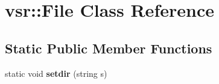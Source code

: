 \hypertarget{classvsr_1_1_file}{\section{vsr\-:\-:File Class Reference}
\label{classvsr_1_1_file}
}
\subsection*{Static Public Member Functions}
\begin{DoxyCompactItemize}
\item 
\hypertarget{classvsr_1_1_file_a2230ed664af8adb49b741a03ee22e200}{static void {\bfseries setdir} (string s)}\label{classvsr_1_1_file_a2230ed664af8adb49b741a03ee22e200}

\end{DoxyCompactItemize}

